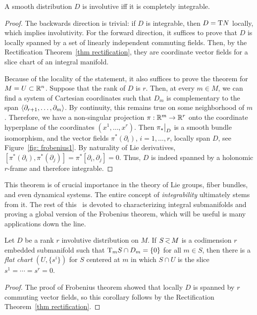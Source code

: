\begin{thm}\label{thm frobenius}
    A smooth distribution $D$ is involutive iff it is completely integrable.
\end{thm}
\begin{proof}
    The backwards direction is trivial: if $D$ is integrable, then $D=\mathrm{T} N$ locally, which implies involutivity.
    For the forward direction, it suffices to prove that $D$ is locally spanned by a set of linearly independent commuting fields. Then, by the Rectification Theorem~\ref{thm rectification}, they are coordinate vector fields for a slice chart of an integral manifold.

    Because of the locality of the statement, it also suffices to prove the theorem for $M=U\subset \mathbb{R}^n$. Suppose that the rank of $D$ is $r$. Then, at every $m\in M$, we can find a system of Cartesian coordinates such that $D_m$ is complementary to the span $\langle\partial_{r+1},\ldots,\partial_m\rangle$. By continuity, this remains true on some neighborhood of $m$. Therefore, we have a non-singular projection $\pi:\mathbb{R}^m\to\mathbb{R}^r$ onto the coordinate hyperplane of the coordinates $(x^1,\ldots,x^r)$. Then $\restr{\pi_\ast}{D}$ is a smooth bundle isomorphism, and the vector fields $\pi^\ast(\partial_i)$, $i=1,\ldots,r$, locally span $D$, see Figure~\ref{fig: frobenius1}. By naturality of Lie derivatives, $[\pi^\ast(\partial_i),\pi^\ast(\partial_j)]=\pi^\ast[\partial_i,\partial_j]=0.$
    Thus, $D$ is indeed spanned by a holonomic $r$-frame and therefore integrable.
\end{proof}

This theorem is of crucial importance in the theory of Lie groups, fiber bundles, and even dynamical systems. The entire concept of \emph{integrability} ultimately stems from it. The rest of this \sect\ is devoted to characterizing integral submanifolds and proving a global version of the Frobenius theorem, which will be useful is many applications down the line.

\begin{cor}\label{cor 19.13 Lee}
    Let $D$ be a rank $r$ involutive distribution on $M$. If $S\emb M$ is a codimension $r$ embedded submanifold such that $\mathrm{T}_mS\cap D_m=\{0\}$ for all $m\in S$, then there is a \emph{flat chart} $(U,\{s^i\})$ for $S$ centered at $m$ in which $S\cap U$ is the slice $s^1=\cdots=s^r=0$.
\end{cor}
\begin{proof}
    The proof of Frobenius theorem showed that locally $D$ is spanned by $r$ commuting vector fields, so this corollary follows by the Rectification Theorem~\ref{thm rectification}.
\end{proof}

